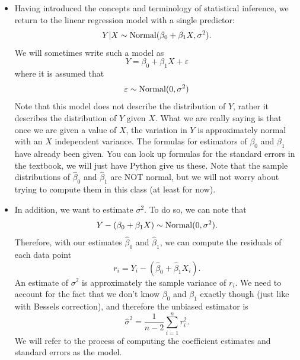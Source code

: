 \begin{itemize}
\item Having introduced the concepts and terminology of statistical inference, we return to the linear regression model with a single predictor:
\begin{align*}
Y|X \sim {\rm Normal}(\beta_0 + \beta_1X,\sigma^2).
\end{align*}
We will sometimes write such a model as
\begin{equation*}
Y = \beta_0 + \beta_1X + \varepsilon
\end{equation*}
where it is assumed that 
\begin{equation*}
\varepsilon \sim {\rm Normal}(0,\sigma^2)
\end{equation*}
Note that this model does not describe the distribution of $Y$, rather it describes the distribution of $Y$ given $X$. What we are really saying is that once we are given a value of $X$, the variation in $Y$ is approximately normal with an $X$ independent variance. The formulas for estimators of $\beta_0$ and $\beta_1$ have already been given. You can look up formulas for the standard errors in the textbook, we will just have Python give us these. 
Note that the sample distributions of $\hat{\beta}_0$ and $\hat{\beta}_1$ are NOT normal, but we will not worry about trying to compute them in this class (at least for now). 
\item In addition, we want to estimate $\sigma^2$. To do so, we can note that 
\begin{equation*}
Y - (\beta_0 +\beta_1X) \sim {\rm Normal}(0,\sigma^2).
\end{equation*}
Therefore, with our estimates  $\hat{\beta}_0$ and $\hat{\beta}_1$, we can compute the residuals of each data point
\begin{equation*}
r_i = Y_i  -  (\hat{\beta}_0 +\hat{\beta}_1X_i).
\end{equation*}
An estimate of $\sigma^2$ is approximately the sample variance of $r_i$. We need to account for the fact that we don't know $\beta_0$ and $\beta_1$ exactly though (just like with Bessels correction), and therefore the unbiased estimator is
\begin{equation*}
\hat{\sigma}^2= \frac{1}{n-2} \sum_{i=1}^nr_i^2. 
\end{equation*}
We will refer to the process of computing the coefficient estimates and standard errors as  the model. 



\end{itemize}
